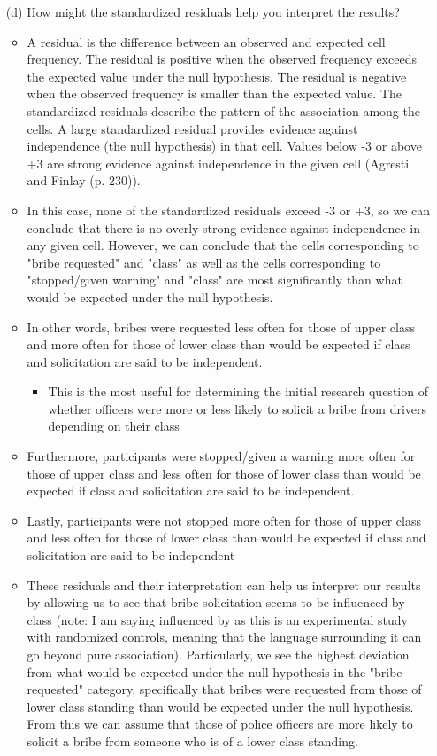 \documentclass[12pt,letterpaper]{article}
\begin{document}
\begin{enumerate}
		
	\vspace{0cm}
	\item [(d)] How might the standardized residuals help you interpret the results?  
		\begin{itemize}
			\item A residual is the difference between an observed and expected cell frequency. The residual is positive when the observed frequency exceeds the expected value under the null hypothesis. The residual is negative when the observed frequency is smaller than the expected value. The standardized residuals describe the pattern of the association among the cells. A large standardized residual provides evidence against independence (the null hypothesis) in that cell. Values below -3 or above +3 are strong evidence against independence in the given cell (Agresti and Finlay (p. 230)).
			\item In this case, none of the standardized residuals exceed -3 or +3, so we can conclude that there is no overly strong evidence against independence in any given cell. However, we can conclude that the cells corresponding to "bribe requested" and "class" as well as the cells corresponding to "stopped/given warning" and "class" are most significantly than what would be expected under the null hypothesis.
			\item In other words, bribes were requested less often for those of upper class and more often for those of lower class than would be expected if class and solicitation are said to be independent.
				\begin{itemize}
					\item This is the most useful for determining the initial research question of whether officers were more or less likely to solicit a bribe from drivers depending on their class
				\end{itemize}
			\item Furthermore, participants were stopped/given a warning more often for those of upper class and less often for those of lower class than would be expected if class and solicitation are said to be independent.
			\item Lastly, participants were not stopped more often for those of upper class and less often for those of lower class than would be expected if class and solicitation are said to be independent
			\item These residuals and their interpretation can help us interpret our results by allowing us to see that bribe solicitation seems to be influenced by class (note: I am saying influenced by as this is an experimental study with randomized controls, meaning that the language surrounding it can go beyond pure association). Particularly, we see the highest deviation from what would be expected under the null hypothesis in the "bribe requested" category, specifically that bribes were requested from those of lower class standing than would be expected under the null hypothesis. From this we can assume that those of police officers are more likely to solicit a bribe from someone who is of a lower class standing.
		\end{itemize}
	
\end{enumerate}
\newpage
\end{document}
